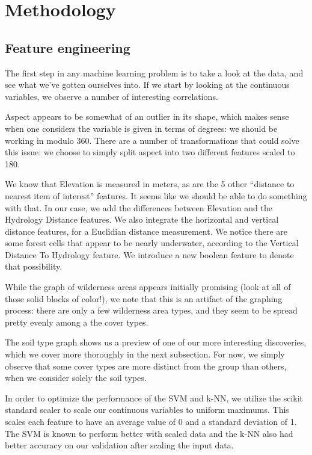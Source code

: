 \section{Methodology}
\label{sec:-method}


\subsection{Feature engineering}
The first step in any machine learning problem is to take a look at the 
data, and see what we've gotten ourselves into.  If we start by looking 
at the continuous variables, we observe a number of interesting 
correlations.  

Aspect appears to be somewhat of an outlier in its shape, 
which makes sense when one considers the variable is given in terms of 
degrees: we should be working in modulo 360.  There are a number of 
transformations that could solve this issue: we choose to simply split 
aspect into two different features scaled to 180\degree.

We know that Elevation is measured in meters, as are the 5 other 
``distance to nearest item of interest'' features.  It seems like we 
should be able to do something with that.  In our case, we add the 
differences between Elevation and the Hydrology Distance features.  We 
also integrate the horizontal and vertical distance features, for a 
Euclidian distance measurement. We notice there are some forest cells 
that appear to be nearly underwater, according to the Vertical Distance 
To Hydrology feature.  We introduce a new boolean feature to denote 
that possibility.  

While the graph of wilderness areas appears initially promising (look 
at all of those solid blocks of color!), we note that this is an 
artifact of the graphing process: there are only a few wilderness area 
types, and they seem to be spread pretty evenly among a the cover types.

The soil type graph shows us a preview of one of our more interesting 
discoveries, which we cover more thoroughly in the next subsection. For 
now, we simply observe that some cover types are more distinct from the 
group than others, when we consider solely the soil types.

In order to optimize the performance of the SVM and k-NN, we utilize the scikit 
standard scaler to scale our continuous variables to uniform maximums. This scales
each feature to have an average value of 0 and a standard deviation of 1. The SVM
is known to perform better with scaled data and the k-NN also had better accuracy
on our validation after scaling the input data.

